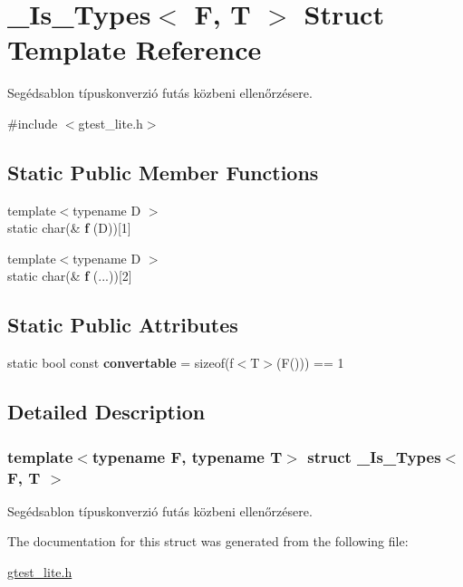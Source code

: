 \hypertarget{struct___is___types}{}\section{\+\_\+\+Is\+\_\+\+Types$<$ F, T $>$ Struct Template Reference}
\label{struct___is___types}


Segédsablon típuskonverzió futás közbeni ellenőrzésere.  




{\ttfamily \#include $<$gtest\+\_\+lite.\+h$>$}

\subsection*{Static Public Member Functions}
\begin{DoxyCompactItemize}
\item 
\mbox{\label{struct___is___types_a56e08a2768c571caab81e9bc47d5acc6}} 
{\footnotesize template$<$typename D $>$ }\\static char(\& {\bfseries f} (D))\mbox{[}1\mbox{]}
\item 
\mbox{\label{struct___is___types_a013da65c5a92e9bd02f5d361c10d376d}} 
{\footnotesize template$<$typename D $>$ }\\static char(\& {\bfseries f} (...))\mbox{[}2\mbox{]}
\end{DoxyCompactItemize}
\subsection*{Static Public Attributes}
\begin{DoxyCompactItemize}
\item 
\mbox{\label{struct___is___types_aef853f15f013611d0890cb6fc408ae47}} 
static bool const {\bfseries convertable} = sizeof(f$<$T$>$(F())) == 1
\end{DoxyCompactItemize}


\subsection{Detailed Description}
\subsubsection*{template$<$typename F, typename T$>$\newline
struct \+\_\+\+Is\+\_\+\+Types$<$ F, T $>$}

Segédsablon típuskonverzió futás közbeni ellenőrzésere. 

The documentation for this struct was generated from the following file\+:\begin{DoxyCompactItemize}
\item 
\mbox{\hyperlink{gtest__lite_8h}{gtest\+\_\+lite.\+h}}\end{DoxyCompactItemize}
